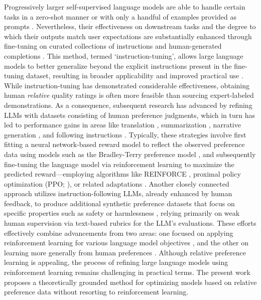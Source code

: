 Progressively larger self-supervised language models are able to handle certain tasks in a zero-shot manner \citep{radford2019language} or with only a handful of examples provided as prompts \citep{gpt3,megatron,chowdhery2022palm}. Nevertheless, their effectiveness on downstream tasks and the degree to which their outputs match user expectations are substantially enhanced through fine-tuning on curated collections of instructions and human-generated completions \citep{mishra-etal-2022-cross,sanh2022multitask,chung2022scaling,thoppilan2022lamda}. This method, termed `instruction-tuning', allows large language models to better generalize beyond the explicit instructions present in the fine-tuning dataset, resulting in broader applicability and improved practical use \citep{chung2022scaling}. While instruction-tuning has demonstrated considerable effectiveness, obtaining human \textit{relative} quality ratings is often more feasible than sourcing expert-labeled demonstrations. As a consequence, subsequent research has advanced by refining LLMs with datasets consisting of human preference judgments, which in turn has led to performance gains in areas like translation \citep{kreutzer-etal-2018-reliability}, summarization \citep{stiennon2022learning,ziegler2020finetuning}, narrative generation \citep{ziegler2020finetuning}, and following instructions \citep{ouyang2022training,ramamurthy2023is}. Typically, these strategies involve first fitting a neural network-based reward model to reflect the observed preference data using models such as the Bradley-Terry preference model \citep{bradley1952rankanalysis}, and subsequently fine-tuning the language model via reinforcement learning to maximize the predicted reward—employing algorithms like REINFORCE \citep{williams1992reinforce}, proximal policy optimization (PPO; \cite{schulman2017proximal}), or related adaptations \citep{ramamurthy2023is}. Another closely connected approach utilizes instruction-following LLMs, already enhanced by human feedback, to produce additional synthetic preference datasets that focus on specific properties such as safety or harmlessness \citep{bai2022constitutional}, relying primarily on weak human supervision via text-based rubrics for the LLM's evaluations. These efforts effectively combine advancements from two areas: one focused on applying reinforcement learning for various language model objectives \citep{Ranzato2015SequenceLT,paulus2018a,wu2018learning}, and the other on learning more generally from human preferences \citep{christiano2017deep,kupcsik2018learning}. Although relative preference learning is appealing, the process of refining large language models using reinforcement learning remains challenging in practical terms. The present work proposes a theoretically grounded method for optimizing models based on relative preference data without resorting to reinforcement learning.

